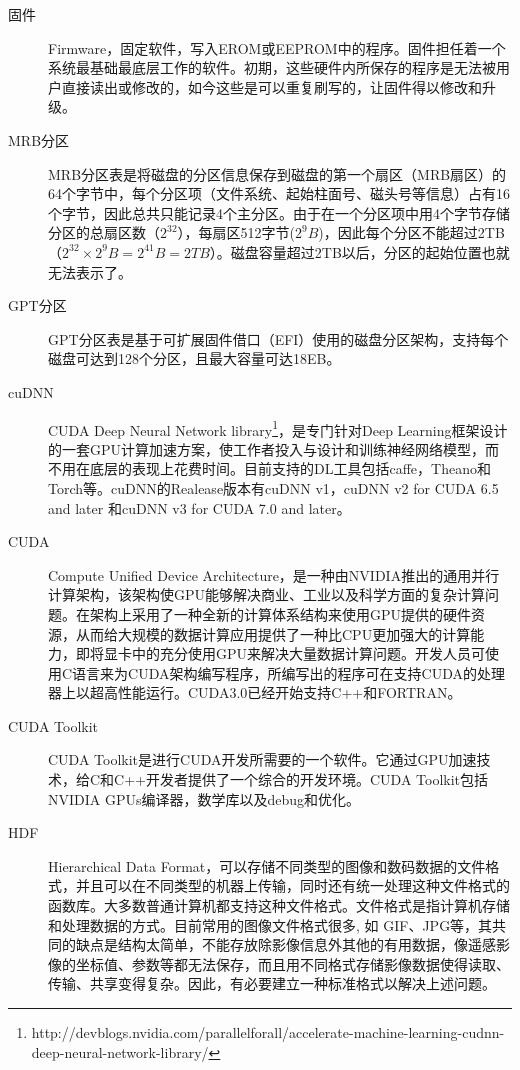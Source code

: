 \begin{description}
\item[固件] Firmware，固定软件，写入EROM或EEPROM中的程序。固件担任着一个系统最基础最底层工作的软件。初期，这些硬件内所保存的程序是无法被用户直接读出或修改的，如今这些是可以重复刷写的，让固件得以修改和升级。

\item[MRB分区] MRB分区表是将磁盘的分区信息保存到磁盘的第一个扇区（MRB扇区）的64个字节中，每个分区项（文件系统、起始柱面号、磁头号等信息）占有16个字节，因此总共只能记录4个主分区。由于在一个分区项中用4个字节存储分区的总扇区数（$2^{32}$），每扇区512字节($2^{9}B$)，因此每个分区不能超过2TB（$2^{32} \times 2^{9}B=2^{41}B=2TB$）。磁盘容量超过2TB以后，分区的起始位置也就无法表示了。

\item[GPT分区] GPT分区表是基于可扩展固件借口（EFI）使用的磁盘分区架构，支持每个磁盘可达到128个分区，且最大容量可达18EB。

\item[cuDNN] CUDA Deep Neural Network library\footnote{http://devblogs.nvidia.com/parallelforall/accelerate-machine-learning-cudnn-deep-neural-network-library/}，是专门针对Deep Learning框架设计的一套GPU计算加速方案，使工作者投入与设计和训练神经网络模型，而不用在底层的表现上花费时间。目前支持的DL工具包括caffe，Theano和Torch等。cuDNN的Realease版本有cuDNN v1，cuDNN v2 for CUDA 6.5 and later 和cuDNN v3 for CUDA 7.0 and later。

\item[CUDA] Compute Unified Device Architecture，是一种由NVIDIA推出的通用并行计算架构，该架构使GPU能够解决商业、工业以及科学方面的复杂计算问题。在架构上采用了一种全新的计算体系结构来使用GPU提供的硬件资源，从而给大规模的数据计算应用提供了一种比CPU更加强大的计算能力，即将显卡中的充分使用GPU来解决大量数据计算问题。开发人员可使用C语言来为CUDA架构编写程序，所编写出的程序可在支持CUDA的处理器上以超高性能运行。CUDA3.0已经开始支持C++和FORTRAN。

\item[CUDA Toolkit] CUDA Toolkit是进行CUDA开发所需要的一个软件。它通过GPU加速技术，给C和C++开发者提供了一个综合的开发环境。CUDA Toolkit包括NVIDIA GPUs编译器，数学库以及debug和优化。

\item[HDF] Hierarchical Data Format，可以存储不同类型的图像和数码数据的文件格式，并且可以在不同类型的机器上传输，同时还有统一处理这种文件格式的函数库。大多数普通计算机都支持这种文件格式。文件格式是指计算机存储和处理数据的方式。目前常用的图像文件格式很多, 如 GIF、JPG等，其共同的缺点是结构太简单，不能存放除影像信息外其他的有用数据，像遥感影像的坐标值、参数等都无法保存，而且用不同格式存储影像数据使得读取、传输、共享变得复杂。因此，有必要建立一种标准格式以解决上述问题。


\end{description}

